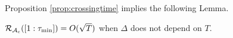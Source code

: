 Proposition \ref{prop:crossingtime} implies the following Lemma.
 \begin{lemma}\label{lem:regretcrossingtime}
$\mathcal{R}_{\mathcal{A}_c}([1:\tau_{\min}])=O(\sqrt{T})$ when $\Delta$ does not depend on $T$.
\end{lemma}
%


